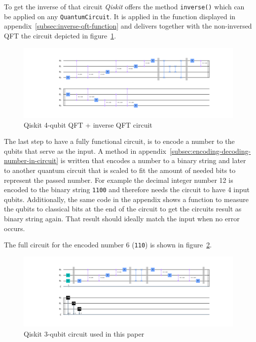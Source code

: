 To get the inverse of that circuit \emph{Qiskit} offers the method \texttt{inverse()} which can be applied on any \texttt{QuantumCircuit}.
It is applied in the function displayed in appendix~\ref{subsec:inverse-qft-function} and delivers together with the non-inversed QFT the circuit depicted in figure~\ref{fig:qft-4-qubit-circuit-with-inverse}.

\begin{figure}[H]
    \centering
    \includegraphics[width=\textwidth]{res/qft-4-qubits-circuit-with-inverse.pdf}
    \caption{Qiskit 4-qubit QFT + inverse QFT circuit}
    \label{fig:qft-4-qubit-circuit-with-inverse}
\end{figure}

The last step to have a fully functional circuit, is to encode a number to the qubits that serve as the input.
A method in appendix~\ref{subsec:encoding-decoding-number-in-circuit} is written that encodes a number to a binary string and later to another quantum circuit that is scaled to fit the amount of needed bits to represent the passed number.
For example the decimal integer number 12 is encoded to the binary string \texttt{1100} and therefore needs the circuit to have 4 input qubits.
Additionally, the same code in the appendix shows a function to measure the qubits to classical bits at the end of the circuit to get the circuits result as binary string again.
That result should ideally match the input when no error occurs.

The full circuit for the encoded number \(6\) (\texttt{110}) is shown in figure~\ref{fig:full-qft-3-qubit-circuit}.

\begin{figure}[H]
    \centering
    \includegraphics[width=\textwidth]{res/full-qft-3-qubit-circuit.pdf}
    \caption{Qiskit 3-qubit circuit used in this paper}
    \label{fig:full-qft-3-qubit-circuit}
\end{figure}

